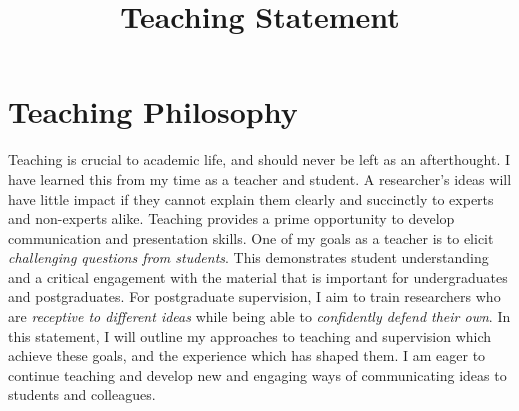 \documentclass[12pt]{article}
\title{Teaching Statement}
\date{}
\author{}
\begin{document}
\maketitle
\thispagestyle{empty}

\section*{Teaching Philosophy}

Teaching is crucial to academic life, and should never be left as an afterthought.
%
I have learned this from my time as a teacher and student.
%
A researcher's ideas will have little impact if they cannot explain them clearly and succinctly to experts and non-experts alike.
%
Teaching provides a prime opportunity to develop communication and presentation skills.
%
One of my goals as a teacher is to elicit \emph{challenging questions from students}.
%
This demonstrates student understanding and a critical engagement with the material that is important for undergraduates and postgraduates.
%
For postgraduate supervision, I aim to train researchers who are \emph{receptive to different ideas} while being able to \emph{confidently defend their own}.
%
In this statement, I will outline my approaches to teaching and supervision which achieve these goals, and the experience which has shaped them.
%
I am eager to continue teaching and develop new and engaging ways of communicating ideas to students and colleagues.

\iffalse
Teaching is essential to academic life and should never be dismissed as an afterthought.
%
Academics cannot succeed without the ability to clearly, succinctly explain their ideas.
%
In particular, they should be able to communicate with non-experts; teaching provides the perfect opportunity to develop this skill.
%
%
Teaching should be engaging and stimulating for students.

I'm early in my teaching career, but look forward to developing interesting and entertaining teaching methods through an active dialogue with students.

From my experience teaching, and as a student, I've found that grounding content into practical real-world examples, providing hands on work, and covering state-of-the-art methods and ideas are key ways to achieve this.
%
An indicator of a teacher's success is the questions they receive from students.
% 
If a teacher receives novel, challenging questions, the students have understood the material and are engaging with it critically.
%
This should be the ultimate goal of teaching, and is what I aim for.
%
This is particularly applicable to postgraduates, who we should teach to view the world with a critical eye and develop original ideas.
\fi
\end{document}
